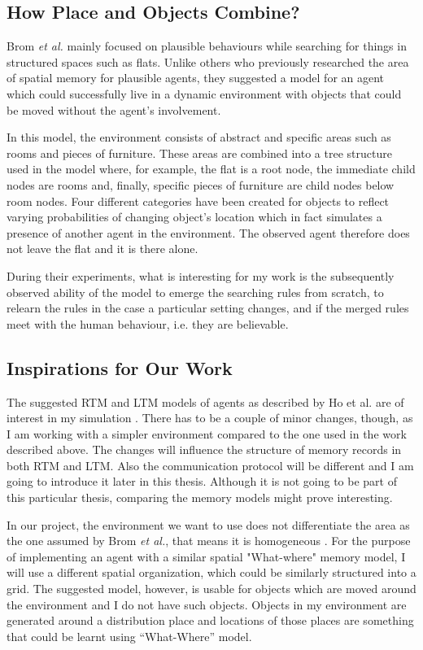 \subsection{How Place and Objects Combine?}
\label{subsec:howplaceandobjectscombine}

Brom \textit{et al.} mainly focused on plausible behaviours while searching for things in structured spaces such as flats.\cite{Brom:placeandobjects} Unlike others who previously researched the area of spatial memory for plausible agents, they suggested a model for an agent which could successfully live in a dynamic environment with objects that could be moved without the agent’s involvement. 

In this model, the environment consists of abstract and specific areas such as rooms and pieces of furniture. These areas are combined into a tree structure used in the model where, for example, the flat is a root node, the immediate child nodes are rooms and, finally, specific pieces of furniture are child nodes below room nodes. Four different categories have been created for objects to reflect varying probabilities of changing object’s location which in fact simulates a presence of another agent in the environment. The observed agent therefore does not leave the flat and it is there alone.

During their experiments, what is interesting for my work is the subsequently observed ability of the model to emerge the searching rules from scratch, to relearn the rules in the case a particular setting changes, and if the merged rules meet with the human behaviour, i.e. they are believable.
                 
\subsection{Inspirations for Our Work}

The suggested RTM and LTM models of agents as described by Ho et al. are of interest in my simulation \cite{Ho:memoryarchitectures}. There has to be a couple of minor changes, though, as I am working with a simpler environment compared to the one used in the work described above. The changes will influence the structure of memory records in both RTM and LTM. Also the communication protocol will be different and I am going to introduce it later in this thesis. Although it is not going to be part of this particular thesis, comparing the memory models might prove interesting.

In our project, the environment we want to use does not differentiate the area as the one assumed by Brom \textit{et al.}, that means it is homogeneous \cite{Brom:placeandobjects}. For the purpose of implementing an agent with a similar spatial "What-where" memory model, I will use a different spatial organization, which could be similarly structured into a grid. The suggested model, however, is usable for objects which are moved around the environment and I do not have such objects. Objects in my environment are generated around a distribution place and locations of those places are something that could be learnt using “What-Where” model. 